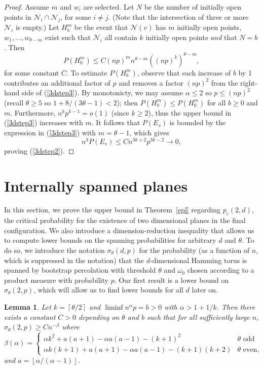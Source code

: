 \documentclass{amsart}
\newcommand{\floor}[1]{\left\lfloor#1\right \rfloor}
\newcommand{\ceil}[1]{\left\lceil#1\right \rceil}
\newcommand{\threshold}{\theta}
\numberwithin{equation}{section}
\newtheorem{lemma}[theorem]{Lemma}
\theoremstyle{definition}
\theoremstyle{remark}
\begin{document}
\begin{proof}
Assume $m$ and $w_i$ are selected. Let $N$ be the number of 
initially open points in $\mathcal{N}_i\cap \mathcal{N}_j$, for some
$i\ne j$. (Note that the intersection of three or more $\mathcal{N}_i$ is empty.)
Let $H_b^m$ be the event that $\mathcal{N}(v)$ has $m$ initially open points, $w_1, \ldots, w_{\threshold-m}$ exist such that $\mathcal{N}_i$ 
all contain $k$ initially open points {\it and\/} that 
$N=b$. Then 
\begin{equation}
\label{3dstep3}
P(H_0^m)\le C(np)^m n^{\theta-m} \left((np)^k\right)^{\theta-m},
\end{equation}
for some constant $C$. To estimate $P(H_b^m)$, observe that
each increase of $b$ by 1 contributes an additional factor of $p$ and removes a factor
$(np)^2$ from the right-hand side of (\ref{3dstep3}). By monotonicty, we may assume 
$\alpha\le 2$ so $p\le (np)^2$ (recall $\threshold\geq 5$ so $1+ 8/(3\threshold-1)<2$); then $P(H_b^m)\le P(H_0^m)$ for all $b\ge 0$ and $m$. 
Furthermore, $n^k p^{k-1} = o(1)$ (since $k\geq 2$), thus the upper bound in (\ref{3dstep3}) increases 
with $m$.  It follows that $P(E_v)$ is bounded by the expression in (\ref{3dstep3}) with $m=\theta-1$, 
which gives
$$
n^3P(E_v)\le C n^{3k+2}p^{3k-2}\to 0,
$$
proving (\ref{3dstep2}).
\end{proof}
 

\section{Internally spanned planes}
\label{suffforplanes}
In this section, we prove the upper bound in Theorem~\ref{epl} regarding $p_c(2,d)$, the critical probability for the existence of two dimensional planes in the final configuration.  We also introduce a dimension-reduction inequality that allows us to compute lower bounds on the spanning probabilities for arbitrary $d$ and $\threshold$.  To do so, we introduce the notation $\sigma_\theta(d,p)$ for the probability (as a function of $n$, which is suppressed in the notation) that the $d$-dimensional Hamming torus is spanned by bootstrap percolation with threshold $\theta$ and $\omega_0$ chosen according to a product measure with probability $p$.  Our first result is a lower bound on $\sigma_\theta(2,p)$, which will allow us to find lower bounds for all $d$ later on.

\begin{lemma}
\label{2d-span-lb-lem}
Let $k = \ceil{\theta/2}$ and $\liminf n^{\alpha}p = b >0$ with $\alpha > 1+1/k$.  Then there exists a constant $C>0$ depending on $\theta$ and $b$ such that for all sufficiently large $n$, $\sigma_{\theta}(2,p)\geq Cn^{-\beta}$ where
\begin{equation}
\beta(\alpha) = \begin{cases}
 \alpha k^2 +a(a+1) - \alpha a(a-1) - (k+1)^2 & \theta \text{ odd} \\
 \alpha k(k+1) + a(a+1) - \alpha a(a-1) - (k+1)(k+2) & \theta \text{ even},
\end{cases}
\end{equation}
and $a = \floor{\alpha/(\alpha-1)}$.
\end{lemma}
\end{document}
